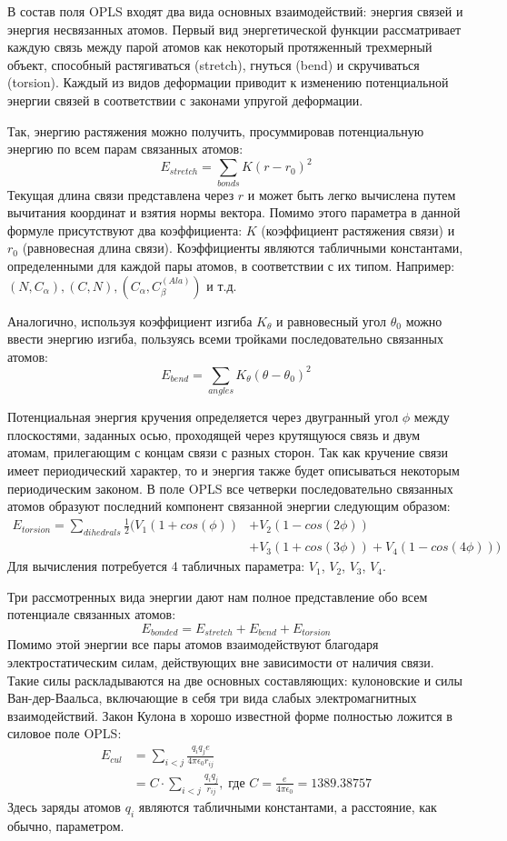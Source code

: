   В состав поля OPLS входят два вида основных взаимодействий: энергия связей и энергия несвязанных атомов.
  Первый вид энергетической функции рассматривает каждую связь между парой атомов как некоторый протяженный трехмерный объект, способный растягиваться (stretch), гнуться (bend) и скручиваться (torsion).
  Каждый из видов деформации приводит к изменению потенциальной энергии связей в соответствии с законами упругой деформации.

  Так, энергию растяжения можно получить, просуммировав потенциальную энергию по всем парам связанных атомов:
  $$
  E_{stretch} = \sum_{bonds}K(r - r_0)^2
  $$
  Текущая длина связи представлена через $r$ и может быть легко вычислена путем вычитания координат и взятия нормы вектора.
  Помимо этого параметра в данной формуле присутствуют два коэффициента: $K$ (коэффициент растяжения связи) и $r_0$ (равновесная длина связи).
  Коэффициенты являются табличными константами, определенными для каждой пары атомов, в соответствии с их типом.
  Например: $(N, C_{\alpha}), (C, N), (C_{\alpha}, C_{\beta}^{(Ala)})$ и т.д.

  Аналогично, используя коэффициент изгиба $K_{\theta}$ и равновесный угол $\theta_0$ можно ввести энергию изгиба, пользуясь всеми тройками последовательно связанных атомов:
  $$
  E_{bend} = \sum_{angles}K_{\theta}(\theta - \theta_0)^2
  $$

  Потенциальная энергия кручения определяется через двугранный угол $\phi$ между плоскостями, заданных осью, проходящей через крутящуюся связь и двум атомам, прилегающим с концам связи с разных сторон.
  Так как кручение связи имеет периодический характер, то и энергия также будет описываться некоторым периодическим законом.
  В поле OPLS все четверки последовательно связанных атомов образуют последний компонент связанной энергии следующим образом:
  $$
  \begin{aligned}
    E_{torsion} = \sum_{dihedrals}\frac{1}{2}(V_1(1 + cos(\phi)) &+ V_2(1 - cos(2\phi))\\
    &+ V_3(1 + cos(3\phi)) + V_4(1 - cos(4\phi)))
  \end{aligned}
  $$
  Для вычисления потребуется 4 табличных параметра: $V_1$, $V_2$, $V_3$, $V_4$.

  Три рассмотренных вида энергии дают нам полное представление обо всем потенциале связанных атомов:
  $$
  E_{bonded} = E_{stretch} + E_{bend} + E_{torsion}
  $$
  Помимо этой энергии все пары атомов взаимодействуют благодаря электростатическим силам, действующих вне зависимости от наличия связи.
  Такие силы раскладываются на две основных составляющих: кулоновские и силы Ван-дер-Ваальса, включающие в себя три вида слабых электромагнитных взаимодействий.
  Закон Кулона в хорошо известной форме полностью ложится в силовое поле OPLS:
  $$
  \begin{aligned}
  E_{cul} &= \sum_{i < j} \frac{q_i q_j e}{4 \pi \epsilon_0 r_{ij}} \\
         &= C \cdot \sum_{i < j} \frac{q_i q_j}{r_{ij}},\; \text{где } C = \frac{e}{4 \pi \epsilon_0} = 1389.38757  
  \end{aligned}
  $$
  Здесь заряды атомов $q_i$ являются табличными константами, а расстояние, как обычно, параметром.

